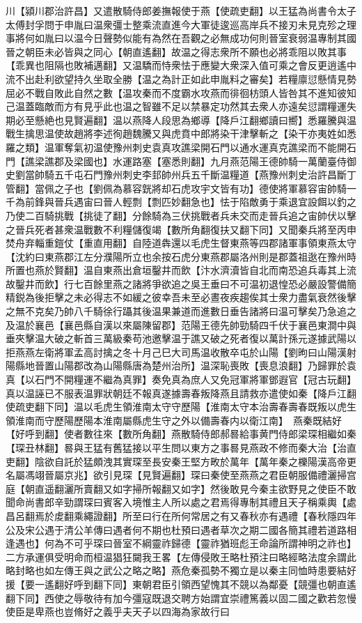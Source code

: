 川【潁川郡治許昌】又遣散騎侍郎姜撫報使于燕【使疏吏翻】以王猛為尚書令太子太傅封孚問于申胤曰温衆彊士整乘流直進今大軍徒逡巡高岸兵不接刃未見克殄之理事將何如胤曰以温今日聲勢似能有為然在吾觀之必無成功何則晉室衰弱温專制其國晉之朝臣未必皆與之同心【朝直遙翻】故温之得志衆所不願也必將乖阻以敗其事【乖異也阻隔也敗補邁翻】又温驕而恃衆怯于應變大衆深入值可乘之會反更逍遙中流不出赴利欲望持久坐取全勝【温之為計正如此申胤料之審矣】若糧廪愆懸情見勢屈必不戰自敗此自然之數【温攻秦而不度霸水攻燕而徘徊枋頭人皆咎其不進知彼知己温蓋臨敵而方有見乎此也温之智雖不足以禁暴定功然其去衆人亦遠矣愆謂糧運失期必至懸絶也見賢遍翻】温以燕降人段思為鄉導【降戶江翻鄉讀曰嚮】悉羅騰與温戰生擒思温使故趙將李述徇趙魏騰又與虎賁中郎將染干津擊斬之【染干亦夷姓如悉羅之類】温軍奪氣初温使豫州刺史袁真攻譙梁開石門以通水運真克譙梁而不能開石門【譙梁譙郡及梁國也】水運路塞【塞悉則翻】九月燕范陽王德帥騎一萬蘭臺侍御史劉當帥騎五千屯石門豫州刺史李邽帥州兵五千斷温糧道【燕豫州刺史治許昌斷丁管翻】當佩之子也【劉佩為慕容皝將却石虎攻宇文皆有功】德使將軍慕容宙帥騎一千為前鋒與晉兵遇宙曰晉人輕剽【剽匹妙翻急也】怯于陷敵勇于乘退宜設餌以釣之乃使二百騎挑戰【挑徒了翻】分餘騎為三伏挑戰者兵未交而走晉兵追之宙帥伏以擊之晉兵死者甚衆温戰數不利糧儲復竭【數所角翻復扶又翻下同】又聞秦兵將至丙申焚舟弃輜重鎧仗【重直用翻】自陸道犇還以毛虎生督東燕等四郡諸軍事領東燕太守【沈約曰東燕郡江左分濮陽所立也余按石虎分東燕郡屬洛州則是郡蓋祖逖在豫州時所置也燕於賢翻】温自東燕出倉垣鑿井而飲【汴水濟瀆皆自北而南恐追兵毒其上流故鑿井而飲】行七百餘里燕之諸將爭欲追之吳王垂曰不可温初退惶恐必嚴設警備簡精鋭為後拒擊之未必得志不如緩之彼幸吾未至必晝夜疾趨俟其士衆力盡氣衰然後擊之無不克矣乃帥八千騎徐行躡其後温果兼道而進數日垂告諸將曰温可擊矣乃急追之及温於襄邑【襄邑縣自漢以來屬陳留郡】范陽王德先帥勁騎四千伏于襄邑東澗中與垂夾擊温大破之斬首三萬級秦苟池邀擊温于譙又破之死者復以萬計孫元遂據武陽以拒燕燕左衛將軍孟高討擒之冬十月己巳大司馬温收散卒屯於山陽【劉昫曰山陽漢射陽縣地晉置山陽郡改為山陽縣唐為楚州治所】温深恥喪敗【喪息浪翻】乃歸罪於袁真【以石門不開糧運不繼為真罪】奏免真為庶人又免冠軍將軍鄧遐官【冠古玩翻】真以温誣已不服表温罪狀朝廷不報真遂據壽春叛降燕且請救亦遣使如秦【降戶江翻使疏吏翻下同】温以毛虎生領淮南太守守歷陽【淮南太守本治壽春壽春既叛以虎生領淮南而守歷陽歷陽本淮南屬縣虎生守之外以備壽春内以衛江南】　燕秦既結好【好呼到翻】使者數往來【數所角翻】燕散騎侍郎郝晷給事黄門侍郎梁琛相繼如秦【琛丑林翻】晷與王猛有舊猛接以平生問以東方之事晷見燕政不修而秦大治【治直吏翻】陰欲自託於猛頗洩其實琛至長安秦王堅方畋於萬年【萬年秦之櫟陽漢高帝更名屬馮翊晉屬京兆】欲引見琛【見賢遍翻】琛曰秦使至燕燕之君臣朝服備禮灑掃宫庭【朝直遥翻灑所賣翻又如字掃所報翻又如字】然後敢見今秦主欲野見之使臣不敢聞命尚書郎辛勁謂琛曰賓客入境惟主人所以處之君焉得專制其禮且天子稱乘輿【處昌呂翻焉於䖍翻乘繩證翻】所至曰行在所何常居之有又春秋亦有遇禮【春秋隱四年公及宋公遇于清公羊傳曰遇者何不期也杜預曰遇者草次之期二國各簡其禮若道路相逢遇也】何為不可乎琛曰晉室不綱靈祚歸德【靈祚猶班彪王命論所謂神明之祚也】二方承運俱受明命而桓温猖狂闚我王畧【左傳侵敗王略杜預注曰略經略法度余謂此略封略也如左傳王與之武公之略之略】燕危秦孤勢不獨立是以秦主同恤時患要結好援【要一遙翻好呼到翻下同】東朝君臣引領西望愧其不競以為鄰憂【競彊也朝直遙翻下同】西使之辱敬待有加今彊寇既退交聘方始謂宜崇禮篤義以固二國之歡若忽慢使臣是卑燕也豈脩好之義乎夫天子以四海為家故行曰